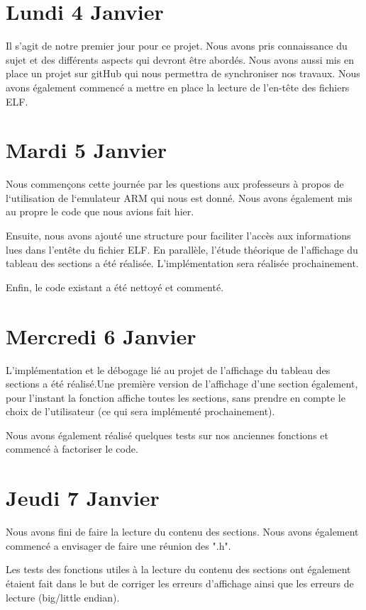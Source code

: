 \documentclass[12pt, a4paper]{article}
\begin{document}
\section{Lundi 4 Janvier}

Il s'agit de notre premier jour pour ce projet. Nous avons pris 
connaissance du sujet et des différents aspects qui devront être 
abordés. Nous avons aussi mis en place un projet sur gitHub qui nous 
permettra de synchroniser nos travaux. Nous avons également 
commencé a mettre en place la lecture de l'en-t\^ete des fichiers 
ELF.

\section{Mardi 5 Janvier}

Nous commençons cette journée par les questions aux professeurs à propos de 
l`utilisation de l`emulateur ARM qui nous est donn\'e. Nous avons également 
mis au propre le code que nous avions fait hier.

Ensuite, nous avons ajouté une structure pour faciliter l'accès aux 
informations lues dans l’entête du fichier ELF. En parallèle, l'étude 
théorique de l'affichage du tableau des sections a été réalisée. 
L'implémentation sera réalisée prochainement.

Enfin, le code existant a été nettoyé et commenté.

\section{Mercredi 6 Janvier}

L'implémentation et le débogage lié au projet de l'affichage du tableau des 
sections a été réalisé.Une première version de l'affichage d'une section 
également, pour l'instant la fonction affiche toutes les sections, sans 
prendre en compte le choix de l'utilisateur (ce qui sera implémenté 
prochainement).

Nous avons également réalisé quelques tests sur nos anciennes fonctions et 
commencé à factoriser le code.

\section{Jeudi 7 Janvier}

Nous avons fini de faire la lecture du contenu des sections. Nous avons 
également commenc\'e a envisager de faire une réunion des ".h". 

Les tests des fonctions utiles à la lecture du contenu des sections ont 
également étaient fait dans le but de corriger les erreurs d'affichage ainsi 
que les erreurs de lecture (big/little endian).
\end{document}
